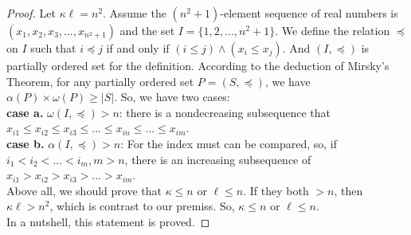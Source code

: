 \documentclass[12pt]{article}
\begin{document}
\begin{proof}
    Let $\kappa\ell=n^2$. Assume the $(n^2+1)$-element sequence of real numbers is $(x_1,x_2,x_3,...,x_{n^2+1})$ and the set $I=\{1,2,...,n^2+1\}$. We define the relation $\preccurlyeq$ on $I$ such that $i\preccurlyeq j$ if and only if $(i\leqslant j)\land (x_i\leqslant x_j)$.
    And $(I,\preccurlyeq)$ is partially ordered set for the definition. According to the deduction of Mirsky's Theorem, for any partially ordered set $P=(S,\preccurlyeq)$, we have $\alpha (P) \times \omega (P)\geqslant |S|$. So, we have two cases:
    \\\textbf{case a.} $\omega(I,\preccurlyeq)>n$: there is a nondecreasing subsequence that $x_{i1}\leqslant x_{i2}\leqslant x_{i3}\leqslant ... \leqslant x_{in} \leqslant ... \leqslant x_{im}$.
    \\\textbf{case b.} $\alpha(I,\preccurlyeq)>n$: For the index must can be compared, so, if $i_1< i_2< ... < i_m,m>n$, there is an increasing subsequence of $x_{i1} > x_{i2} > x_{i3} > ... > x_{im}$.
    \\Above all, we should prove that $\kappa \leqslant n$ or $\ell \leqslant n $. If they both $>n$, then $\kappa\ell>n^2$, which is contrast to our premiss. So, $\kappa \leqslant n$ or $\ell \leqslant n $.
    \\In a nutshell, this statement is proved.
\end{proof}
\end{document}
